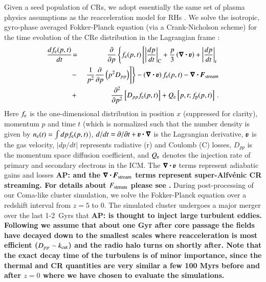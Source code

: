 \documentclass[a4paper,fleqn,usenatbib]{mnras}
\newcommand{\bcdot}{\ensuremath{%
  \mathchoice%
   {\mskip\thinmuskip\lower0.2ex\hbox{\scalebox{1.5}{$\cdot$}}\mskip\thinmuskip}}%
   {\mskip\thinmuskip\lower0.2ex\hbox{\scalebox{1.5}{$\cdot$}}\mskip\thinmuskip}%
   {\lower0.3ex\hbox{\scalebox{1.2}{$\cdot$}}}%
   {\lower0.3ex\hbox{\scalebox{1.2}{$\cdot$}}}%
}
\renewcommand{\vec}{\ensuremath{\mathbfit}}
\newcommand{\bvel}{\ensuremath{\boldsymbol{\varv}}}
\newcommand{\bnabla}{\ensuremath{\boldsymbol{\nabla}}}
\def\AP#1{{\bf  AP: #1}}
\begin{document}
Given a seed population of CRs, we adopt essentially the same set of
plasma physics assumptions as the reacceleration model for RHs
\citep{brunetti07,brunetti11}. We solve the isotropic, gyro-phase
averaged Fokker-Planck equation (via a Crank-Nicholson scheme) for the
time evolution of the CRe distribution in the Lagrangian frame
\citep{brunetti07,brunetti11}:
\begin{eqnarray}
{{d f_{\rmn{e}}(p,t)}\over{d t}} &\!=&
\frac{\partial}{\partial p}
\left\{
f_{\rmn{e}}(p,t)\left[
\left|{{dp}\over{dt}}\right|_{\rm C} 
+ \frac{p}{3}\left(\bnabla\bcdot \bvel\right)
+ \left|{{dp}\over{dt}}\right|_{\rm r}\right.\right.
\nonumber\\
&-& \left.\left.{1\over{p^2}}{{\partial }\over{\partial p}}\left(p^2 D_{pp}\right) 
\right]\right\} - \left(\bnabla\bcdot \bvel\right) f_{\rmn{e}}(p,t)
- \bnabla\bcdot \vec{F}_\rmn{stream}
\nonumber\\
&+& {{\partial^2 }\over{\partial p^2}}
\left[
D_{pp} f_{\rmn{e}}(p,t) \right]+ Q_{\rmn{e}}\left[p,t;f_{\rmn{p}}(p,t)\right]   \, .
\label{elettroni}
\end{eqnarray}
Here $f_{{\mathrm{e}}}$ is the one-dimensional distribution in position $x$
(suppressed for clarity), momentum $p$ and time $t$ (which is
normalized such that the number density is given by
$n_{{\mathrm{e}}}(t)=\int d p f_{{\mathrm{e}}}(p,t)$), $d/dt=\partial/\partial
t+\bvel\bcdot\bnabla$ is the Lagrangian derivative, $\bvel$ is the gas
velocity, $|dp/dt|$ represents radiative (r) and Coulomb (C) losses,
$D_{pp}$ is the momentum space diffusion coefficient, and
$Q_{{\mathrm{e}}}$ denotes the injection rate of primary and secondary
electrons in the ICM. The $\bnabla\bcdot \bvel$ terms represent
adiabatic gains and losses \AP{and the $\bnabla\bcdot
  \vec{F}_\rmn{stream}$ terms represent super-Alfv{\'e}nic CR
  streaming. For details about $F_{\mathrm{stream}}$ please see
  \citet{wiener13}.} During post-processing of our Coma-like cluster
simulation, we solve the Fokker-Planck equation over a redshift
interval from $z=5$ to 0. The simulated cluster undergoes a major
merger over the last 1-2~Gyrs that \AP{is thought to inject large
  turbulent eddies. Following \citet{brunetti07,brunetti11} \citep[see
    also][]{2004ApJ...614..757Y,2015ApJ...800...60M} we assume that
  about one Gyr after core passage the fields have decayed down to the
  smallest scales where reacceleration is most efficient ($D_{pp}\sim
  k_{\mathrm{cut}}$) and the radio halo turns on shortly after. Note that
  the exact decay time of the turbulens is of minor importance, since
  the thermal and CR quantities are very similar a few 100 Myrs before
  and after $z=0$ where we have chosen to evaluate the simulations.}
\end{document}
